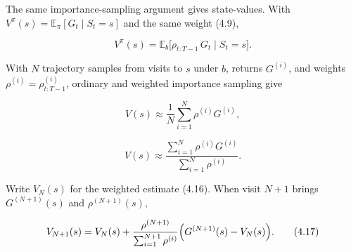 The same importance-sampling argument gives state-values. With $V^\pi(s)=\mathbb{E}_\pi[G_t\mid S_t=s]$ and the same weight (4.9),

\begin{equation}
V^\pi(s)
=
\mathbb{E}_b\bigl[\rho_{t:T-1}\,G_t\mid S_t=s\bigr].
\tag{4.14}
\end{equation}

With $N$ trajectory samples from visits to $s$ under $b$, returns $G^{(i)}$, and weights $\rho^{(i)}=\rho_{t:T-1}^{(i)}$, ordinary and weighted importance sampling give

\begin{equation}
V(s)
\approx
\frac{1}{N}\sum_{i=1}^{N}\rho^{(i)}G^{(i)},
\tag{4.15}
\end{equation}

\begin{equation}
V(s)
\approx
\frac{\sum_{i=1}^{N}\rho^{(i)}G^{(i)}}{\sum_{i=1}^{N}\rho^{(i)}}.
\tag{4.16}
\end{equation}

Write $V_N(s)$ for the weighted estimate (4.16). When visit $N{+}1$ brings $G^{(N+1)}(s)$ and $\rho^{(N+1)}(s)$,

\begin{equation}
V_{N+1}(s)
=
V_N(s)
+
\frac{\rho^{(N+1)}}{\sum_{i=1}^{N+1} \rho^{(i)}}
\Bigl(
G^{(N+1)}(s) - V_N(s)
\Bigr).
\tag{4.17}
\end{equation}
